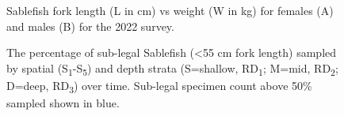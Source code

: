 \documentclass[12pt]{article}\usepackage[]{graphicx}\usepackage[]{color}
\begin{document}
\begin{figure}[htb]

{\centering {} 

}

\caption{Sablefish fork length (L in cm) vs weight (W in kg) for females (A) and males (B) for the 2022 survey.}\label{fig:figure14}
\end{figure}

\begin{figure}[htb]

{\centering {} 

}

\caption{The percentage of sub-legal Sablefish (\textless55 cm fork length) sampled by spatial (S\textsubscript{1}-S\textsubscript{5}) and depth strata (S=shallow, RD\textsubscript{1}; M=mid, RD\textsubscript{2}; D=deep, RD\textsubscript{3}) over time. Sub-legal specimen count above 50\% sampled shown in blue.}\label{fig:figure15}
\end{figure}
\clearpage
\end{document}
